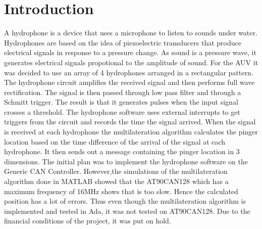 \section{Introduction}\label{sec:introduction}
A hydrophone is a device that uses a microphone to listen to sounds under water\cite{web:hydrophone}. Hydrophones are based on the idea of piezoelectric transducers that produce electrical signals in response to a pressure change. As sound is a pressure wave, it generates electrical signals propotional to the amplitude of sound.
For the AUV it was decided to use an array of 4 hydrophones arranged in a rectangular pattern. 
The hydrophone circuit amplifies the received signal and then performs full wave rectification. The signal is then passed through low pass filter and through a Schmitt trigger. The result is that it generates pulses when the input signal crosses a threshold. \newline
The hydrophone software uses external interrupts to get triggers from the circuit and records the time the signal arrived. When the signal is received at each hydrophone the multilateration algorithm calculates the pinger location based on the time difference of the arrival of the signal at each hydrophone. It then sends out a message containing the pinger location in 3 dimensions.\newline
The initial plan was to implement the hydrophone software on the Generic CAN Controller. However,the simulations of the multilateration algorithm done in MATLAB showed that the AT90CAN128 which has a maximum frequency of 16MHz shows that is too slow. Hence the calculated position has a lot of errors. Thus even though the multilateration algorithm is implemented and tested in Ada, it was not tested on AT90CAN128. Due to the financial conditions of the project, it was put on hold.
  

